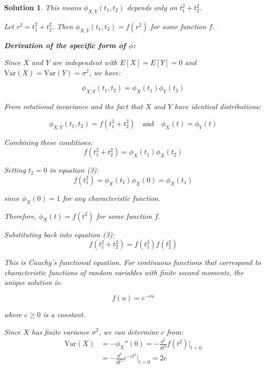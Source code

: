 \documentclass[12pt]{amsart}
\newtheorem*{solution}{Solution}
\begin{document}
\begin{solution}
This means $\phi_{X,Y}(t_1, t_2)$ depends only on $t_1^2 + t_2^2$.

Let $r^2 = t_1^2 + t_2^2$. Then $\phi_{X,Y}(t_1, t_2) = f(r^2)$ for some function $f$.

\textbf{Derivation of the specific form of $\phi$:}

Since $X$ and $Y$ are independent with $E[X] = E[Y] = 0$ and $\mathrm{Var}(X) = \mathrm{Var}(Y) = \sigma^2$, we have:

\begin{equation}
\phi_{X,Y}(t_1, t_2) = \phi_X(t_1)\phi_Y(t_2)
\end{equation}

From rotational invariance and the fact that $X$ and $Y$ have identical distributions:

\begin{equation}
\phi_{X,Y}(t_1, t_2) = f(t_1^2 + t_2^2) \quad \text{and} \quad \phi_X(t) = \phi_Y(t)
\end{equation}

Combining these conditions:
\begin{equation}
f(t_1^2 + t_2^2) = \phi_X(t_1)\phi_X(t_2)
\end{equation}

Setting $t_2 = 0$ in equation (3):
\begin{equation}
f(t_1^2) = \phi_X(t_1)\phi_X(0) = \phi_X(t_1)
\end{equation}

since $\phi_X(0) = 1$ for any characteristic function.

Therefore, $\phi_X(t) = f(t^2)$ for some function $f$.

Substituting back into equation (3):
\begin{equation}
f(t_1^2 + t_2^2) = f(t_1^2)f(t_2^2)
\end{equation}

This is Cauchy's functional equation. For continuous functions that correspond to characteristic functions of random variables with finite second moments, the unique solution is:

\begin{equation}
f(u) = e^{-cu}
\end{equation}

where $c \geq 0$ is a constant.

Since $X$ has finite variance $\sigma^2$, we can determine $c$ from:
\begin{align}
\mathrm{Var}(X) &= -\phi_X''(0) = -\frac{d^2}{dt^2}f(t^2)\bigg|_{t=0}\\
&= -\frac{d^2}{dt^2}e^{-ct^2}\bigg|_{t=0} = 2c
\end{align}


\end{solution}
\end{document}

